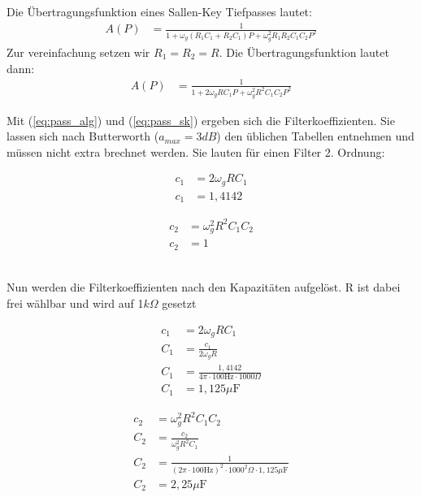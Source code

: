 \documentclass[11pt,twoside,openright]{mpreport}
\begin{document}
Die Übertragungsfunktion eines Sallen-Key Tiefpasses lautet:
\begin{align*}
A(P)&=\frac{1}{1+\omega_g (R_1 C_1 + R_2 C_1)P + \omega_g^2R_1 R_2 C_1C_2P^2}
\end{align*}
Zur vereinfachung setzen wir $R_1 =R_2=R$. Die Übertragungsfunktion lautet dann:
\begin{align}
A(P)&=\frac{1}{1+2\omega_g RC_1P+\omega_g^2R^2C_1C_2P^2}
\label{eq:pass_sk}
\end{align}


Mit (\ref{eq:pass_alg}) und (\ref{eq:pass_sk}) ergeben sich die Filterkoeffizienten. 
Sie lassen sich nach Butterworth ($a_{max}=3dB$) den üblichen Tabellen
entnehmen und müssen nicht extra brechnet werden. Sie lauten für einen Filter 2. Ordnung:

\begin{minipage}{0.5\textwidth}
\begin{align*}
c_1 &= 2\omega_g R C_1\\
c_1 &= 1,4142
\end{align*}
\end{minipage}
\begin{minipage}{0.5\textwidth}
\begin{align*}
c_2&=\omega_g^2 R^2 C_1 C_2\\
c_2&= 1
\end{align*}
\end{minipage}
\\

Nun werden die Filterkoeffizienten nach den Kapazitäten aufgelöst. R ist dabei frei wählbar und wird auf 1$k\Omega$ gesetzt

\begin{minipage}{0.5\textwidth}
\begin{align*}
  c_1&= 2\omega_g R C_1\\
  C_1&=\frac{c_1}{2\omega_g R}\\
  C_1&=\frac{1,4142}{4\pi \cdot 100\text{Hz} \cdot1000\Omega}\\
  C_1&=1,125\mu\text{F}
\end{align*}
\end{minipage}
\begin{minipage}{0.5\textwidth}
\begin{align*}
  c_2&=\omega_g^2 R^2 C_1 C_2\\
  C_2&=\frac{c_2}{\omega_g^2 R^2C_1}\\
  C_2&=\frac{1}{(2\pi \cdot 100\text{Hz})^2 \cdot 1000^2\Omega \cdot 1,125\mu\text{F}}\\
  C_2&=2,25\mu\text{F}
\end{align*}
\end{minipage}
\\
\end{document}
